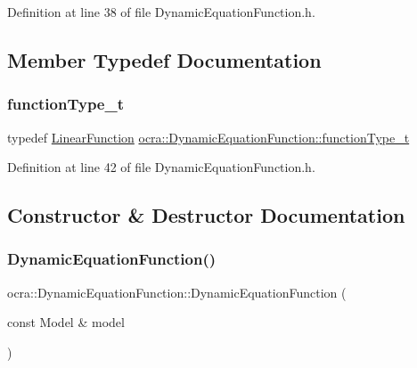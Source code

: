 Definition at line 38 of file Dynamic\+Equation\+Function.\+h.



\subsection{Member Typedef Documentation}
\hypertarget{classocra_1_1DynamicEquationFunction_a2c8c76bfd66285d63895ec34219175b4}{}\label{classocra_1_1DynamicEquationFunction_a2c8c76bfd66285d63895ec34219175b4} 
\subsubsection{\texorpdfstring{function\+Type\+\_\+t}{functionType\_t}}
{\footnotesize\ttfamily typedef \hyperlink{classocra_1_1LinearFunction}{Linear\+Function} \hyperlink{classocra_1_1DynamicEquationFunction_a2c8c76bfd66285d63895ec34219175b4}{ocra\+::\+Dynamic\+Equation\+Function\+::function\+Type\+\_\+t}}



Definition at line 42 of file Dynamic\+Equation\+Function.\+h.



\subsection{Constructor \& Destructor Documentation}
\hypertarget{classocra_1_1DynamicEquationFunction_ab6a38098b1aac7db298e0f3a93955624}{}\label{classocra_1_1DynamicEquationFunction_ab6a38098b1aac7db298e0f3a93955624} 
\subsubsection{\texorpdfstring{Dynamic\+Equation\+Function()}{DynamicEquationFunction()}}
{\footnotesize\ttfamily ocra\+::\+Dynamic\+Equation\+Function\+::\+Dynamic\+Equation\+Function (\begin{DoxyParamCaption}\item[{const Model \&}]{model }\end{DoxyParamCaption})}



